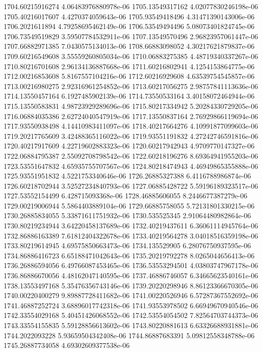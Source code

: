 {1704.60215916274 4.06483976880978e-06
1705.13549317162 4.02077830246198e-06
1705.40216017607 4.4270374059643e-06
1705.93549418496 4.31471390143006e-06
1706.2021611894 4.79258695462149e-06
1706.53549494496 5.08073401824745e-06
1706.73549519829 3.59507784532911e-06
1707.13549570496 2.96823957061447e-06
1707.66882971385 7.0430575134013e-06
1708.66883098052 4.30217621879837e-06
1709.60216549608 3.55559260805034e-06
1710.06883275385 4.48719340337267e-06
1710.80216701608 2.96134136887668e-06
1711.60216802941 4.1254153864775e-06
1712.00216853608 5.8167557104216e-06
1712.60216929608 4.63539754545857e-06
1713.00216980275 2.92316961254852e-06
1713.60217056275 2.98757841113636e-06
1714.13550457164 6.1927485902139e-06
1714.73550533164 3.40158072464944e-06
1715.13550583831 4.98723929289696e-06
1715.80217334942 5.20284330729205e-06
1716.06884035386 2.62724040547919e-06
1717.13550837164 2.76929866119694e-06
1717.93550938498 4.14410983411097e-06
1718.40217664276 4.10991877099603e-06
1719.20217765609 3.42488365116022e-06
1719.93551191832 4.27242746591816e-06
1720.40217917609 4.22719602883323e-06
1720.60217942943 4.9709770147327e-06
1722.06884795387 2.55092708798542e-06
1722.60218196276 8.69364941955203e-06
1723.53551647832 4.65935755707567e-06
1724.80218474943 4.46949865355888e-06
1725.93551951832 4.5221753340646e-06
1726.26885327388 6.4116788986874e-06
1726.60218702944 3.52527234840793e-06
1727.06885428722 5.59196189323517e-06
1727.53552154499 6.428715093368e-06
1728.46885606055 8.2446677387279e-06
1729.00219006944 5.5864403889104e-06
1729.66885758055 5.72131801330215e-06
1730.26885834055 5.33871611751932e-06
1730.535525345 2.91064480982864e-06
1730.80219234944 3.64220458137689e-06
1732.40219437611 6.36061114945764e-06
1732.86886163389 7.61812404322678e-06
1733.40219564278 3.04018516359198e-06
1733.80219614945 4.69575850663473e-06
1734.135529905 6.28076750937595e-06
1734.86886416723 6.65188471042643e-06
1735.20219792278 8.0265044656413e-06
1736.26886594056 6.49766087453465e-06
1736.53553294501 4.03803747967178e-06
1736.86886670056 4.48162047140595e-06
1737.46886746057 6.34665623540161e-06
1738.13553497168 5.35476356743146e-06
1739.20220298946 8.86123366670305e-06
1740.00220400279 9.89887728411682e-06
1741.00220526946 6.57287367552692e-06
1741.46887252724 3.68896017742318e-06
1741.93553978502 6.66949670940546e-06
1742.33554029168 5.40451426068552e-06
1742.53554054502 7.82564703744373e-06
1743.33554155835 5.59128856613602e-06
1743.80220881613 6.63326688931881e-06
1744.2022093228 5.93659504342408e-06
1744.86887683391 5.09812558348788e-06
1745.26887734058 4.69302609377538e-06
}
